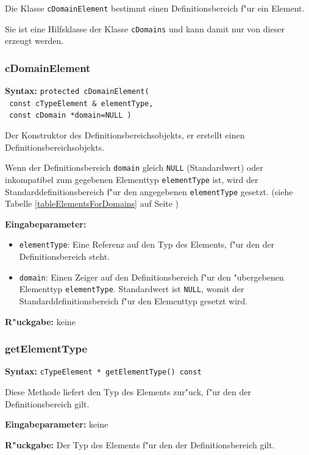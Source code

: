 Die Klasse \verb|cDomainElement| bestimmt einen Definitionsbereich f"ur ein Element.

Sie ist eine Hilfsklasse der Klasse \verb|cDomains| und kann damit nur von dieser erzeugt werden.


\subsubsection{cDomainElement}

\textbf{Syntax:} \verb|protected cDomainElement(| \\\verb| const cTypeElement & elementType,| \\\verb| const cDomain *domain=NULL )|

\bigskip\noindent
Der Konstruktor des Definitionsbereichsobjekts, er erstellt einen Definitionsbereichsobjekts.

Wenn der Definitionsbereich \verb|domain| gleich \verb|NULL| (Standardwert) oder inkompatibel zum gegebenen Elementtyp \verb|elementType| ist, wird der Standarddefinitionsbereich f"ur den angegebenen \verb|elementType| gesetzt. (siehe Tabelle \ref{tableElementsForDomains} auf Seite \pageref{tableElementsForDomains})

\bigskip\noindent
\textbf{Eingabeparameter:}
\begin{itemize}
 \item \verb|elementType|: Eine Referenz auf den Typ des Elements, f"ur den der Definitionsbereich steht.
 \item \verb|domain|: Einen Zeiger auf den Definitionsbereich f"ur den "ubergebenen Elementtyp \verb|elementType|. Standardwert ist \verb|NULL|, womit der Standarddefinitionsbereich f"ur den Elementtyp gesetzt wird.
\end{itemize}

\bigskip\noindent
\textbf{R"uckgabe:} keine


\subsubsection{getElementType}

\textbf{Syntax:} \verb|cTypeElement * getElementType() const|

\bigskip\noindent
Diese Methode liefert den Typ des Elements zur"uck, f"ur den der Definitionsbereich gilt.

\bigskip\noindent
\textbf{Eingabeparameter:} keine

\bigskip\noindent
\textbf{R"uckgabe:} Der Typ des Elements f"ur den der Definitionsbereich gilt.


